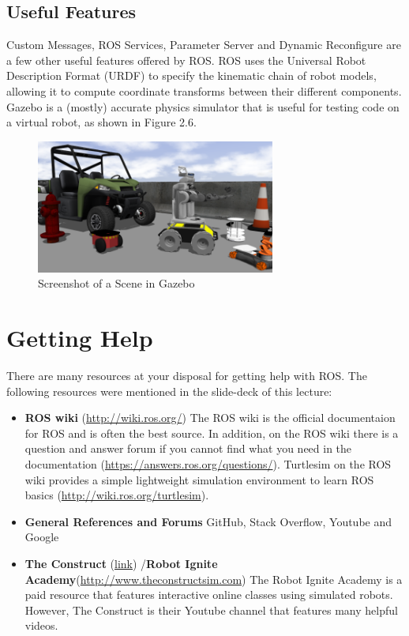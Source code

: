\documentclass[twoside]{article}
\begin{document}
\subsection{Useful Features}
Custom Messages, ROS Services, Parameter Server and Dynamic Reconfigure are a few other useful features offered by ROS. ROS uses the Universal Robot Description Format (URDF) to specify the kinematic chain of robot models, allowing it to compute coordinate transforms between their different components. Gazebo is a (mostly) accurate physics simulator that is useful for testing code on a virtual robot, as shown in Figure 2.6.
\begin{figure}[ht]
\centering
\includegraphics[width=0.7\textwidth]{Gazebo}
\caption{Screenshot of a Scene in Gazebo}
\end{figure}

\newpage
\section{Getting Help}\label{sec:help}

There are many resources at your disposal for getting help with ROS. The following resources were mentioned in the slide-deck of this lecture:

\begin{itemize}
\item \textbf{ROS wiki} (\url{http://wiki.ros.org/})
\newline
The ROS wiki is the official documentaion for ROS and is often the best source. In addition, on the ROS wiki there is a question and answer forum if you cannot find what you need in the documentation (\url{https://answers.ros.org/questions/}). Turtlesim on the ROS wiki provides a simple lightweight  simulation environment to learn ROS basics (\url{http://wiki.ros.org/turtlesim}).

\item \textbf{General References and Forums}
\newline
GitHub, Stack Overflow, Youtube and Google
\item \textbf{The Construct} (\href{https://www.youtube.com/channel/UCt6Lag-vv25fTX3e11mVY1Q}{link}) /\textbf{Robot Ignite Academy}(\url{http://www.theconstructsim.com})
\newline 
The Robot Ignite Academy is a paid resource that features interactive online classes using simulated robots. However, The Construct is their Youtube channel that features many helpful videos.
\end{itemize}
\end{document}
